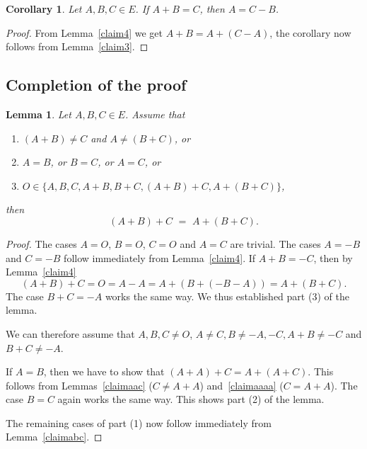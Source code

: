 \documentclass[12pt]{amsart}
\theoremstyle{plain}
\newtheorem{lemma}[theorem]{Lemma}
\newtheorem{corollary}[theorem]{Corollary}
\theoremstyle{remark}
\theoremstyle{definition}
\def\bn{\begin{enumerate}}
\def\en{\end{enumerate}}
\begin{document}
\begin{corollary} \label{cor4}
Let $A,B,C\in E$. If $ A+B=C$, then $A=C-B$.
\end{corollary}

\begin{proof}
From Lemma~\ref{claim4} we get $A+B=A+(C-A)$, the corollary now follows from Lemma~\ref{claim3}.
\end{proof}

\subsection{Completion of the proof} \label{sectionproof}

\begin{lemma} \label{lemmavabc}
Let $A,B,C\in E$.
Assume that
\bn[font=\normalfont]
\item $(A+B) \neq C$ and $A \neq (B+C)$, or
\item $A=B$, or $B=C$, or $A=C$, or
\item $O \in \{A,B,C,A+B,B+C,(A+B)+C,A+(B+C)\}$,
\en
then
\[ (A+B)+C\,\,=\,\,A+(B+C). \]
\end{lemma}

\begin{proof}
The cases $A=O$, $B=O$, $C=O$ and $A=C$ are trivial.
The cases $A=-B$ and $C=-B$ follow immediately from Lemma~\ref{claim4}.
If $A+B=-C$, then by Lemma~\ref{claim4}
      \[ (A+B)+C=O=A-A=A+(B+(-B-A))=A+(B+C). \]
The case $B+C=-A$ works the same way. We thus established part (3) of the lemma.

We can therefore assume that $A,B,C \ne O$, $A \neq C, B\ne -A,-C, A+B \not=-C$ and $B+C\not=-A$.

If $A=B$, then we have to show that $(A+A)+C=A+(A+C)$.
This follows from Lemmas~\ref{claimaac} ($C \neq A+A$) and~\ref{claimaaaa} ($C=A+A$).
The case $B=C$ again works the same way.
This shows part (2) of the lemma.

The remaining cases of part (1) now follow immediately from Lemma~\ref{claimabc}.
\end{proof}
\end{document}
